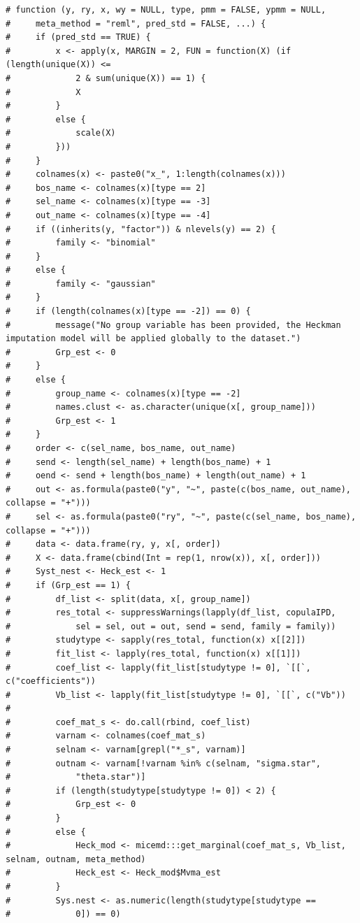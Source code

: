 \documentclass[
  article]{jss}
\begin{document}
\begin{verbatim}
# function (y, ry, x, wy = NULL, type, pmm = FALSE, ypmm = NULL, 
#     meta_method = "reml", pred_std = FALSE, ...) {
#     if (pred_std == TRUE) {
#         x <- apply(x, MARGIN = 2, FUN = function(X) (if (length(unique(X)) <= 
#             2 & sum(unique(X)) == 1) {
#             X
#         }
#         else {
#             scale(X)
#         }))
#     }
#     colnames(x) <- paste0("x_", 1:length(colnames(x)))
#     bos_name <- colnames(x)[type == 2]
#     sel_name <- colnames(x)[type == -3]
#     out_name <- colnames(x)[type == -4]
#     if ((inherits(y, "factor")) & nlevels(y) == 2) {
#         family <- "binomial"
#     }
#     else {
#         family <- "gaussian"
#     }
#     if (length(colnames(x)[type == -2]) == 0) {
#         message("No group variable has been provided, the Heckman imputation model will be applied globally to the dataset.")
#         Grp_est <- 0
#     }
#     else {
#         group_name <- colnames(x)[type == -2]
#         names.clust <- as.character(unique(x[, group_name]))
#         Grp_est <- 1
#     }
#     order <- c(sel_name, bos_name, out_name)
#     send <- length(sel_name) + length(bos_name) + 1
#     oend <- send + length(bos_name) + length(out_name) + 1
#     out <- as.formula(paste0("y", "~", paste(c(bos_name, out_name), collapse = "+")))
#     sel <- as.formula(paste0("ry", "~", paste(c(sel_name, bos_name), collapse = "+")))
#     data <- data.frame(ry, y, x[, order])
#     X <- data.frame(cbind(Int = rep(1, nrow(x)), x[, order]))
#     Syst_nest <- Heck_est <- 1
#     if (Grp_est == 1) {
#         df_list <- split(data, x[, group_name])
#         res_total <- suppressWarnings(lapply(df_list, copulaIPD, 
#             sel = sel, out = out, send = send, family = family))
#         studytype <- sapply(res_total, function(x) x[[2]])
#         fit_list <- lapply(res_total, function(x) x[[1]])
#         coef_list <- lapply(fit_list[studytype != 0], `[[`, c("coefficients"))
#         Vb_list <- lapply(fit_list[studytype != 0], `[[`, c("Vb"))
#         
#         coef_mat_s <- do.call(rbind, coef_list)
#         varnam <- colnames(coef_mat_s)
#         selnam <- varnam[grepl("*_s", varnam)]
#         outnam <- varnam[!varnam %in% c(selnam, "sigma.star", 
#             "theta.star")]
#         if (length(studytype[studytype != 0]) < 2) {
#             Grp_est <- 0
#         }
#         else {
#             Heck_mod <- micemd:::get_marginal(coef_mat_s, Vb_list, selnam, outnam, meta_method)
#             Heck_est <- Heck_mod$Mvma_est
#         }
#         Sys.nest <- as.numeric(length(studytype[studytype == 
#             0]) == 0)

\end{verbatim}
\end{document}
